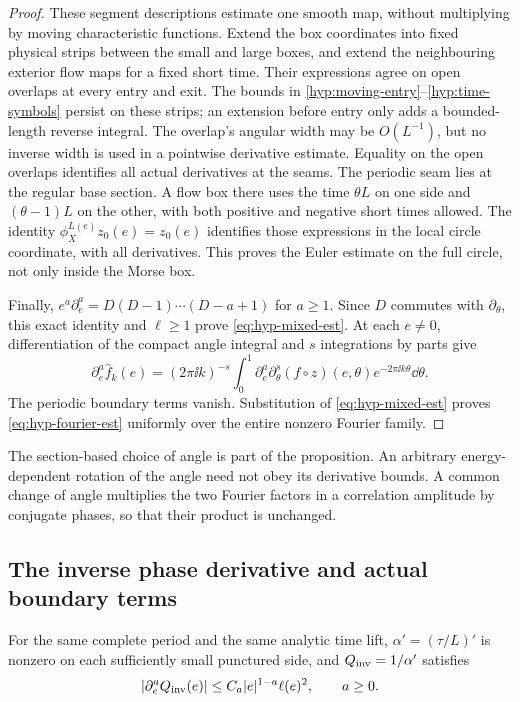 \begin{proof}
These segment descriptions estimate one smooth map, without multiplying
by moving characteristic functions.  Extend the box coordinates into
fixed physical strips between the small and large boxes, and extend
the neighbouring exterior flow maps for a fixed short time.  Their
expressions agree on open overlaps at every entry and exit.  The bounds
in \eqref{hyp:moving-entry}--\eqref{hyp:time-symbols} persist on these
strips; an extension before entry only adds a bounded-length reverse
integral.  The overlap's angular width may be $O(L^{-1})$, but no
inverse width is used in a pointwise derivative estimate.  Equality
on the open overlaps identifies all actual derivatives at the seams.
The periodic seam lies at the regular base section.  A flow box there
uses the time $\theta L$ on one side and $(\theta-1)L$ on the other,
with both positive and negative short times allowed.  The identity
$\phi_X^{L(e)}z_0(e)=z_0(e)$ identifies those expressions in the local
circle coordinate, with all derivatives.  This proves the Euler
estimate on the full circle, not only inside the Morse box.

Finally,
$e^a\partial_e^a=D(D-1)\cdots(D-a+1)$ for $a\ge1$.
Since $D$ commutes with $\partial_\theta$, this exact identity and
$\ell\ge1$ prove \eqref{eq:hyp-mixed-est}.  At each $e\ne0$,
differentiation of the compact angle integral and $s$ integrations by
parts give
\[
 \partial_e^a\widehat f_k(e)=(2\pi\ii k)^{-s}
 \int_0^1\partial_e^a\partial_\theta^s(f\circ z)(e,\theta)
                      e^{-2\pi\ii k\theta}\dd\theta.
\]
The periodic boundary terms vanish.  Substitution of
\eqref{eq:hyp-mixed-est} proves \eqref{eq:hyp-fourier-est} uniformly
over the entire nonzero Fourier family.
\end{proof}

The section-based choice of angle is part of the proposition.  An
arbitrary energy-dependent rotation of the angle need not obey its
derivative bounds.  A common change of angle multiplies the two Fourier
factors in a correlation amplitude by conjugate phases, so that their
product is unchanged.

\subsection{The inverse phase derivative and actual boundary terms}

\begin{lemma}\label{lem:inverse-phase}
For the same complete period and the same analytic time lift,
$\alpha'= (\tau/L)'$ is nonzero on each sufficiently small punctured
side, and $Q_{\rm inv}=1/\alpha'$ satisfies
\begin{equation}\label{hyp:inverse-estimate}
 |\partial_e^aQ_{\rm inv}(e)|\le
       C_a|e|^{1-a}\ell(e)^2,\qquad a\ge0.
\end{equation}
\end{lemma}


